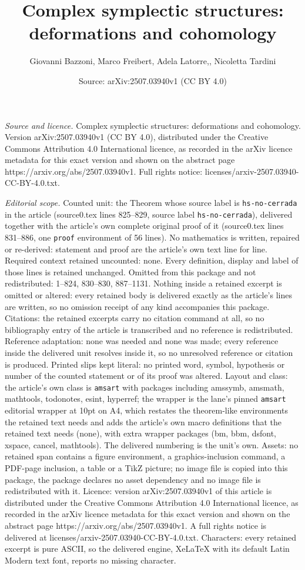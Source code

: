 \documentclass[10pt,a4paper]{amsart}
\title[Complex symplectic structures: deformations and cohomology]{Complex symplectic structures: deformations and cohomology}
\author{Giovanni Bazzoni, Marco Freibert, Adela Latorre,, Nicoletta Tardini}
\date{Source: arXiv:2507.03940v1 (CC BY 4.0)}
\begin{document}
\maketitle

\noindent\emph{Source and licence.} Complex symplectic structures: deformations and cohomology. Version arXiv:2507.03940v1 (CC BY 4.0), distributed under the Creative Commons Attribution 4.0 International licence, as recorded in the arXiv licence metadata for this exact version and shown on the abstract page https://arxiv.org/abs/2507.03940v1. Full rights notice: licenses/arxiv-2507.03940-CC-BY-4.0.txt.\par\smallskip

\noindent\textit{Editorial scope.} Counted unit: the Theorem whose source label is \texttt{hs-no-cerrada} in the article (source0.tex lines 825--829, source label \texttt{hs-no-cerrada}), delivered together with the article's own complete original proof of it (source0.tex lines 831--886, one \texttt{proof} environment of 56 lines). No mathematics is written, repaired or re-derived: statement and proof are the article's own text line for line. Required context retained uncounted: none. Every definition, display and label of those lines is retained unchanged. Omitted from this package and not redistributed: 1--824, 830--830, 887--1131. Nothing inside a retained excerpt is omitted or altered: every retained body is delivered exactly as the article's lines are written, so no omission receipt of any kind accompanies this package. Citations: the retained excerpts carry no citation command at all, so no bibliography entry of the article is transcribed and no reference is redistributed. Reference adaptation: none was needed and none was made; every reference inside the delivered unit resolves inside it, so no unresolved reference or citation is produced. Printed slips kept literal: no printed word, symbol, hypothesis or number of the counted statement or of its proof was altered. Layout and class: the article's own class is \texttt{amsart} with packages including amssymb, amsmath, mathtools, todonotes, esint, hyperref; the wrapper is the lane's pinned \texttt{amsart} editorial wrapper at 10pt on A4, which restates the theorem-like environments the retained text needs and adds the article's own macro definitions that the retained text needs (none), with extra wrapper packages (bm, bbm, dsfont, xspace, cancel, mathtools). The delivered numbering is the unit's own. Assets: no retained span contains a figure environment, a graphics-inclusion command, a PDF-page inclusion, a table or a TikZ picture; no image file is copied into this package, the package declares no asset dependency and no image file is redistributed with it. Licence: version arXiv:2507.03940v1 of this article is distributed under the Creative Commons Attribution 4.0 International licence, as recorded in the arXiv licence metadata for this exact version and shown on the abstract page https://arxiv.org/abs/2507.03940v1. A full rights notice is delivered at licenses/arxiv-2507.03940-CC-BY-4.0.txt. Characters: every retained excerpt is pure ASCII, so the delivered engine, XeLaTeX with its default Latin Modern text font, reports no missing character.
\end{document}
